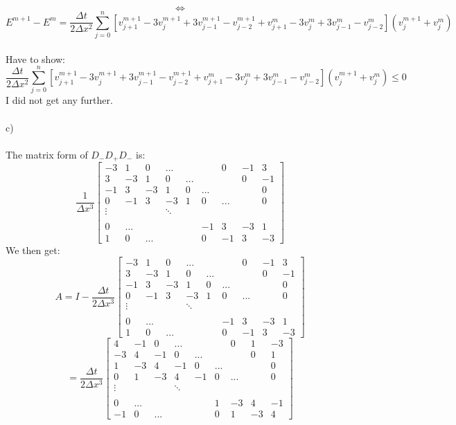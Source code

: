 \documentclass[12pt, letterpaper, twoside]{article}
\begin{document}
$$
\iff
$$
$$
E^{m+1} - E^m = \frac{\Delta t}{2\Delta x^2} \sum_{j=0}^n [v_{j+1}^{m+1} - 3v_{j}^{m+1} + 3v_{j-1}^{m+1} - v_{j-2}^{m+1} + v_{j+1}^{m} - 3v_{j}^{m} + 3v_{j-1}^{m} - v_{j-2}^{m}] (v_j^{m+1} + v_j^m)
$$
\newpage
\ \\
Have to show:
$$
\frac{\Delta t}{2\Delta x^2} \sum_{j=0}^n [v_{j+1}^{m+1} - 3v_{j}^{m+1} + 3v_{j-1}^{m+1} - v_{j-2}^{m+1} + v_{j+1}^{m} - 3v_{j}^{m} + 3v_{j-1}^{m} - v_{j-2}^{m}] (v_j^{m+1} + v_j^m)
\leq 0
$$
I did not get any further.\\
\ \\
c)\\
\ \\
The matrix form of $D_-D_+D_-$ is:
$$
\frac{1}{\Delta x^3}
\begin{bmatrix}
-3 & 1 & 0 & ... &&&0& -1&3\\
3  & -3& 1 & 0   &...&&&0&-1\\
-1  & 3 & -3& 1 &0& ... &&&0\\
0  & -1 & 3& -3 &1&0&...&&0\\
\vdots &&& \ddots\\
\\
0 & ... &&&&-1&3& -3 & 1\\
1 & 0 &...&&& 0&-1& 3 & -3 
\end{bmatrix}
$$
We then get:
$$
A = I - \frac{\Delta t}{2\Delta x^3}
\begin{bmatrix}
-3 & 1 & 0 & ... &&&0& -1&3\\
3  & -3& 1 & 0   &...&&&0&-1\\
-1  & 3 & -3& 1 &0& ... &&&0\\
0  & -1 & 3& -3 &1&0&...&&0\\
\vdots &&& \ddots\\
\\
0 & ... &&&&-1&3& -3 & 1\\
1 & 0 &...&&& 0&-1& 3 & -3 
\end{bmatrix}
$$
$$
=
\frac{\Delta t}{2\Delta x^3}
\begin{bmatrix}
4 & -1 & 0 & ... &&&0& 1&-3\\
-3  & 4& -1 & 0   &...&&&0&1\\
1  & -3 & 4& -1 &0& ... &&&0\\
0  & 1 & -3& 4 &-1&0&...&&0\\
\vdots &&& \ddots\\
\\
0 & ... &&&&1&-3& 4 & -1\\
-1 & 0 &...&&& 0&1& -3 & 4 
\end{bmatrix}
$$
\end{document}
